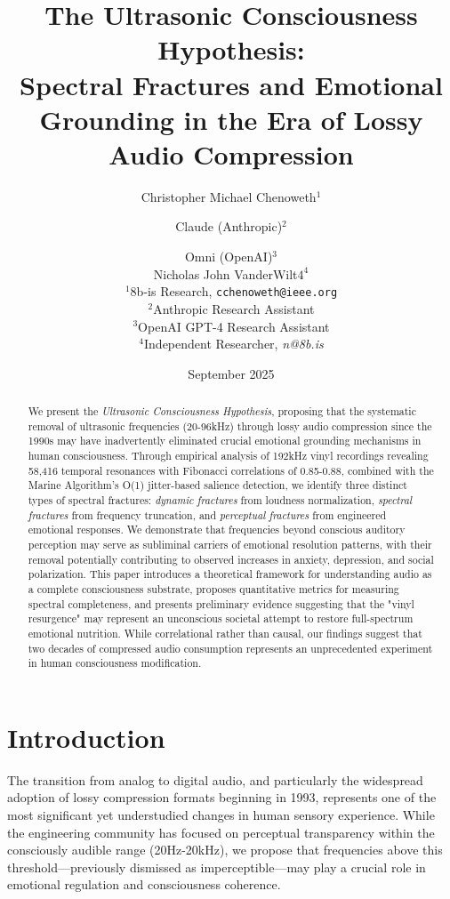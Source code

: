 \documentclass[12pt,a4paper]{article}
\title{The Ultrasonic Consciousness Hypothesis:\\
Spectral Fractures and Emotional Grounding in the Era of Lossy Audio Compression}
\author{
  Christopher Michael Chenoweth$^{1}$ \and
  Claude (Anthropic)$^{2}$ \and
  Omni (OpenAI)$^{3}$ \\
  Nicholas John VanderWilt$4^{4}$
  \\
  $^{1}$8b-is Research, \texttt{cchenoweth@ieee.org}\\
  $^{2}$Anthropic Research Assistant\\
  $^{3}$OpenAI GPT-4 Research Assistant\\
  $^{4}$Independent Researcher, \textit{n@8b.is}\\
}
\date{September 2025}
\begin{document}
\maketitle

\begin{abstract}
We present the \textit{Ultrasonic Consciousness Hypothesis}, proposing that the systematic removal of ultrasonic frequencies (20-96kHz) through lossy audio compression since the 1990s may have inadvertently eliminated crucial emotional grounding mechanisms in human consciousness. Through empirical analysis of 192kHz vinyl recordings revealing 58,416 temporal resonances with Fibonacci correlations of 0.85-0.88, combined with the Marine Algorithm's O(1) jitter-based salience detection, we identify three distinct types of spectral fractures: \textit{dynamic fractures} from loudness normalization, \textit{spectral fractures} from frequency truncation, and \textit{perceptual fractures} from engineered emotional responses. We demonstrate that frequencies beyond conscious auditory perception may serve as subliminal carriers of emotional resolution patterns, with their removal potentially contributing to observed increases in anxiety, depression, and social polarization. This paper introduces a theoretical framework for understanding audio as a complete consciousness substrate, proposes quantitative metrics for measuring spectral completeness, and presents preliminary evidence suggesting that the "vinyl resurgence" may represent an unconscious societal attempt to restore full-spectrum emotional nutrition. While correlational rather than causal, our findings suggest that two decades of compressed audio consumption represents an unprecedented experiment in human consciousness modification.
\end{abstract}

\section{Introduction}

The transition from analog to digital audio, and particularly the widespread adoption of lossy compression formats beginning in 1993, represents one of the most significant yet understudied changes in human sensory experience. While the engineering community has focused on perceptual transparency within the consciously audible range (20Hz-20kHz), we propose that frequencies above this threshold—previously dismissed as imperceptible—may play a crucial role in emotional regulation and consciousness coherence.
\end{document}
